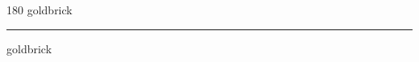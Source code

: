 
\begin{frame}
\begin{center}
\begin{turn}{180}
{\fontsize{2.5cm}{1em}\selectfont goldbrick}
\end{turn}
\vspace{1em}\par  
\hrule
\vspace{1em}\par  
{\fontsize{2.5cm}{1em}\selectfont goldbrick}
\end{center}
\end{frame}

